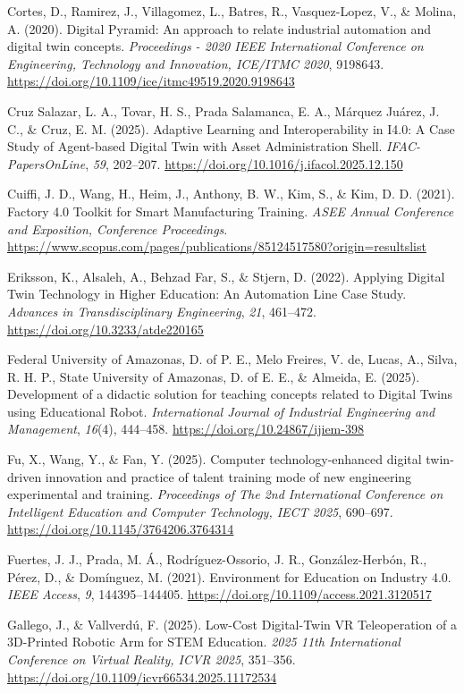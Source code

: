 Cortes, D., Ramirez, J., Villagomez, L., Batres, R., Vasquez-Lopez, V.,
\& Molina, A. (2020). Digital Pyramid: An approach to relate industrial
automation and digital twin concepts. \emph{Proceedings - 2020 IEEE
International Conference on Engineering, Technology and Innovation,
ICE/ITMC 2020}, 9198643.
\url{https://doi.org/10.1109/ice/itmc49519.2020.9198643}

Cruz Salazar, L. A., Tovar, H. S., Prada Salamanca, E. A., Márquez
Juárez, J. C., \& Cruz, E. M. (2025). Adaptive Learning and
Interoperability in I4.0: A Case Study of Agent-based Digital Twin with
Asset Administration Shell. \emph{IFAC-PapersOnLine}, \emph{59}, 202--207.
\url{https://doi.org/10.1016/j.ifacol.2025.12.150}

Cuiffi, J. D., Wang, H., Heim, J., Anthony, B. W., Kim, S., \& Kim, D. D.
(2021). Factory 4.0 Toolkit for Smart Manufacturing Training. \emph{ASEE
Annual Conference and Exposition, Conference Proceedings}.
\url{https://www.scopus.com/pages/publications/85124517580?origin=resultslist}

Eriksson, K., Alsaleh, A., Behzad Far, S., \& Stjern, D. (2022). Applying
Digital Twin Technology in Higher Education: An Automation Line Case
Study. \emph{Advances in Transdisciplinary Engineering}, \emph{21}, 461--472.
\url{https://doi.org/10.3233/atde220165}

Federal University of Amazonas, D. of P. E., Melo Freires, V. de, Lucas,
A., Silva, R. H. P., State University of Amazonas, D. of E. E., \&
Almeida, E. (2025). Development of a didactic solution for teaching
concepts related to Digital Twins using Educational Robot.
\emph{International Journal of Industrial Engineering and Management},
\emph{16}(4), 444--458. \url{https://doi.org/10.24867/ijiem-398}

Fu, X., Wang, Y., \& Fan, Y. (2025). Computer technology-enhanced digital
twin-driven innovation and practice of talent training mode of new
engineering experimental and training. \emph{Proceedings of The 2nd
International Conference on Intelligent Education and Computer
Technology, IECT 2025}, 690--697.
\url{https://doi.org/10.1145/3764206.3764314}

Fuertes, J. J., Prada, M. Á., Rodríguez-Ossorio, J. R., González-Herbón,
R., Pérez, D., \& Domínguez, M. (2021). Environment for Education on
Industry 4.0. \emph{IEEE Access}, \emph{9}, 144395--144405.
\url{https://doi.org/10.1109/access.2021.3120517}

Gallego, J., \& Vallverdú, F. (2025). Low-Cost Digital-Twin VR
Teleoperation of a 3D-Printed Robotic Arm for STEM Education. \emph{2025 11th
International Conference on Virtual Reality, ICVR 2025}, 351--356.
\url{https://doi.org/10.1109/icvr66534.2025.11172534}

